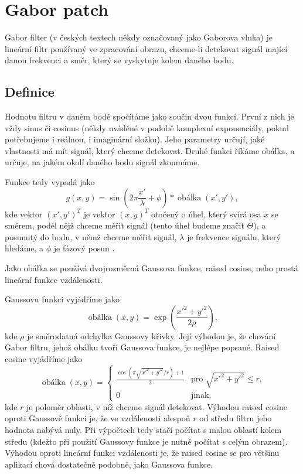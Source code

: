 \section{Gabor patch}

Gabor filter (v českých textech někdy označovaný jako Gaborova vlnka) je
lineární filtr používaný ve zpracování obrazu, chceme-li detekovat signál
mající danou frekvenci a směr, který se vyskytuje kolem daného bodu.

\subsection{Definice}

Hodnotu filtru v daném bodě spočítáme jako součin dvou funkcí. První z nich je
vždy sinus či cosinus (někdy uváděné v podobě komplexní exponenciály, pokud
potřebujeme i reálnou, i imaginární složku). Jeho parametry určují, jaké
vlastnosti má mít signál, který chceme detekovat. Druhé funkci říkáme obálka, a
určuje, na jakém okolí daného bodu signál zkoumáme.

Funkce tedy vypadá jako $$g(x,y) =
\sin\left(2\pi\frac{x'}{\lambda}+\phi\right)*\operatorname{obálka}(x',y'),$$
kde vektor $(x',y')^T$ je vektor $(x,y)^T$ otočený o úhel, který svírá osa $x$
se směrem, podél nějž chceme měřit signál (tento úhel budeme značit $\Theta$),
a posunutý do bodu, v němž chceme měřit signál, $\lambda$ je frekvence signálu,
který hledáme, a $\phi$ je fázový posun \citep{GaborPatch}. 

Jako obálka se používá dvojrozměrná Gaussova funkce, raised cosine, nebo prostá
lineární funkce vzdálenosti. 

Gaussovu funkci vyjádříme jako $$ \operatorname{obálka}(x,y) =
\exp\left(\frac{x'^2 + y'^2}{2\rho}\right),$$ kde $\rho$ je směrodatná odchylka
Gaussovy křivky. Její výhodou je, že chování Gabor filtru, jehož obálku tvoří
Gaussova funkce, je nejlépe popsané. Raised cosine vyjádříme jako 
$$
\operatorname{obálka}(x,y)=
\begin{cases}
 \frac{\cos(\pi\sqrt{x'^2+y'^2}/r)+1}2 &\text{pro $\sqrt{x'^2+y'^2}\leq r$,}\\[1ex]
 0 &\text{jinak,}
\end{cases}
$$ kde $r$ je poloměr oblasti, v níž chceme signál detekovat. Výhodou raised
cosine oproti Gaussově funkci je, že ve vzdálenosti alespoň $r$ od středu
filtru jeho hodnota nabývá nuly. Při výpočtech tedy stačí počítat s malou
oblastí kolem středu (kdežto při použití Gaussovy funkce je nutné počítat s
celým obrazem). Výhodou oproti lineární funkci vzdálenosti je, že raised cosine
se pro většinu aplikací chová dostatečně podobně, jako Gaussova funkce.


